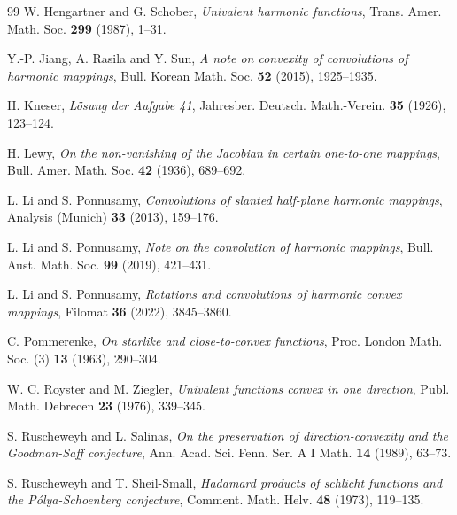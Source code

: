 \documentclass[11pt,reqno]{amsart}
\numberwithin{equation}{section}
\theoremstyle{definition}
\theoremstyle{remark}
\begin{document}
\begin{thebibliography}{99}
W. Hengartner and G. Schober,
\emph{Univalent harmonic functions},
Trans. Amer. Math. Soc. \textbf{299} (1987), 1--31.

Y.-P. Jiang, A. Rasila and Y. Sun, 
\emph{A note on convexity of convolutions of harmonic mappings},
Bull. Korean Math. Soc. \textbf{52} (2015), 1925--1935.

H. Kneser,
\emph{L\"osung der Aufgabe 41},
Jahresber. Deutsch. Math.-Verein. \textbf{35} (1926), 123--124.

H. Lewy,
\emph{On the non-vanishing of the Jacobian in certain one-to-one mappings},
Bull. Amer. Math. Soc. \textbf{42} (1936), 689--692.


L. Li and S. Ponnusamy,
\emph{Convolutions of slanted half-plane harmonic mappings},
Analysis (Munich) \textbf{33} (2013), 159--176.


L. Li and S. Ponnusamy,
\emph{Note on the convolution of harmonic mappings},
Bull. Aust. Math. Soc. \textbf{99} (2019), 421--431.


L. Li and S. Ponnusamy,
\emph{Rotations and convolutions of harmonic convex mappings},
Filomat \textbf{36} (2022), 3845--3860.


C. Pommerenke,
\emph{On starlike and close-to-convex functions},
Proc. London Math. Soc. (3) \textbf{13} (1963), 290--304.

W. C. Royster and M. Ziegler,
\emph{Univalent functions convex in one direction},
Publ. Math. Debrecen \textbf{23} (1976), 339--345.

S. Ruscheweyh and L. Salinas,
\emph{On the preservation of direction-convexity and the Goodman-Saff conjecture},
Ann. Acad. Sci. Fenn. Ser. A I Math. \textbf{14} (1989), 63--73.

S. Ruscheweyh and T. Sheil-Small,
\emph{Hadamard products of schlicht functions and the P\'olya-Schoenberg conjecture},
Comment. Math. Helv. \textbf{48} (1973), 119--135.



\end{thebibliography}
\end{document}
